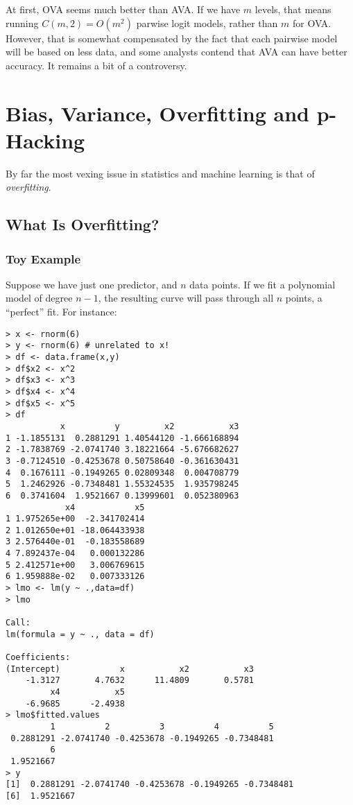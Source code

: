 At first, OVA seems much better than AVA.  If we have $m$ levels, that
means running $C(m,2) = O(m^2)$ parwise logit models, rather than $m$
for OVA.  However, that is somewhat compensated by the fact that each
pairwise model will be based on less data, and some analysts contend
that AVA can have better accuracy.  It remains a bit of a controversy.

\section{Bias, Variance, Overfitting and p-Hacking}
\label{overfitting}

By far the most vexing issue in statistics and machine learning is that
of \textit{overfitting}.  

\subsection{What Is Overfitting?}
\label{norelation}

\subsubsection{Toy Example}

Suppose we have just one predictor, and $n$ data points.  If we fit a
polynomial model of degree $n-1$, the resulting curve will pass through
all $n$ points, a ``perfect'' fit.  For instance:

\begin{lstlisting}
> x <- rnorm(6) 
> y <- rnorm(6) # unrelated to x!
> df <- data.frame(x,y) 
> df$x2 <- x^2 
> df$x3 <- x^3 
> df$x4 <- x^4 
> df$x5 <- x^5 
> df
           x          y         x2           x3
1 -1.1855131  0.2881291 1.40544120 -1.666168894
2 -1.7838769 -2.0741740 3.18221664 -5.676682627
3 -0.7124510 -0.4253678 0.50758640 -0.361630431
4  0.1676111 -0.1949265 0.02809348  0.004708779
5  1.2462926 -0.7348481 1.55324535  1.935798245
6  0.3741604  1.9521667 0.13999601  0.052380963
            x4            x5
1 1.975265e+00  -2.341702414
2 1.012650e+01 -18.064433938
3 2.576440e-01  -0.183558689
4 7.892437e-04   0.000132286
5 2.412571e+00   3.006769615
6 1.959888e-02   0.007333126
> lmo <- lm(y ~ .,data=df) 
> lmo

Call:
lm(formula = y ~ ., data = df)

Coefficients:
(Intercept)            x           x2           x3  
    -1.3127       4.7632      11.4809       0.5781  
         x4           x5  
    -6.9685      -2.4938  
> lmo$fitted.values 
         1          2          3          4          5 
 0.2881291 -2.0741740 -0.4253678 -0.1949265 -0.7348481 
         6 
 1.9521667 
> y
[1]  0.2881291 -2.0741740 -0.4253678 -0.1949265 -0.7348481
[6]  1.9521667
\end{lstlisting}

